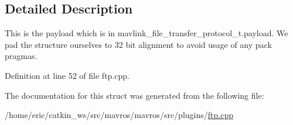 \subsection{Detailed Description}
This is the payload which is in mavlink\+\_\+file\+\_\+transfer\+\_\+protocol\+\_\+t.\+payload. We pad the structure ourselves to 32 bit alignment to avoid usage of any pack pragmas. 

Definition at line 52 of file ftp.\+cpp.



The documentation for this struct was generated from the following file\+:\begin{DoxyCompactItemize}
\item 
/home/eric/catkin\+\_\+ws/src/mavros/mavros/src/plugins/\mbox{\hyperlink{ftp_8cpp}{ftp.\+cpp}}\end{DoxyCompactItemize}
